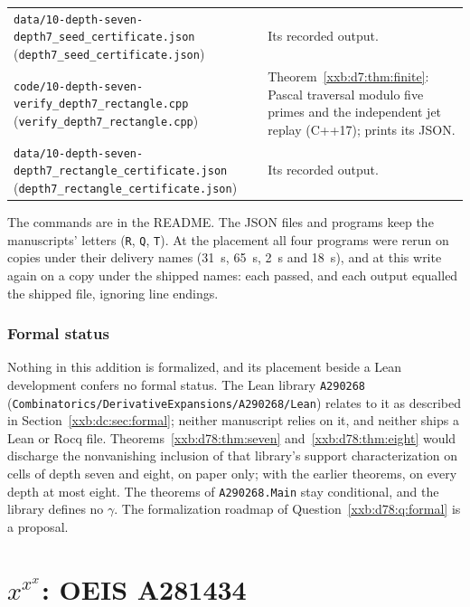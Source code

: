 \documentclass[11pt,a4paper]{article}
\numberwithin{equation}{section}
\theoremstyle{definition}
\theoremstyle{remark}
\theoremstyle{plain}
\begin{document}
\begin{longtable}{@{}>{\raggedright\arraybackslash}p{}>{\raggedright\arraybackslash}p{}@{}}
\texttt{data/10-depth-\allowbreak seven-\allowbreak depth7\_seed\_certificate.json} (\texttt{depth7\_\allowbreak seed\_\allowbreak certificate.json}) & Its recorded output.\\
\texttt{code/10-depth-\allowbreak seven-\allowbreak verify\_depth7\_rectangle.cpp} (\texttt{verify\_\allowbreak depth7\_\allowbreak rectangle.cpp}) & Theorem~\ref{xxb:d7:thm:finite}: Pascal traversal modulo five primes and the independent jet replay (C++17); prints its JSON.\\
\texttt{data/10-depth-\allowbreak seven-\allowbreak depth7\_rectangle\_certificate.json} (\texttt{depth7\_\allowbreak rectangle\_\allowbreak certificate.json}) & Its recorded output.\\
\bottomrule
\end{longtable}
\endgroup
\addtocounter{table}{-1}
The commands are in the README.  The JSON files and programs keep the
manuscripts' letters (\texttt{R}, \texttt{Q}, \texttt{T}).  At the placement
all four programs were rerun on copies under their delivery names (31~s, 65~s,
2~s and 18~s), and at this write again on a copy under the shipped names: each
passed, and each output equalled the shipped file, ignoring line endings.

\subsubsection{Formal status}\label{xxb:d78:sec:formal}

Nothing in this addition is formalized, and its placement beside a Lean
development confers no formal status.  The Lean library \texttt{A290268}
(\texttt{Combinatorics/\allowbreak DerivativeExpansions/\allowbreak A290268/\allowbreak Lean})
relates to it as described in Section~\ref{xxb:dc:sec:formal}; neither
manuscript relies on it, and neither ships a Lean or Rocq file.
Theorems~\ref{xxb:d78:thm:seven} and~\ref{xxb:d78:thm:eight} would discharge
the nonvanishing inclusion of that library's support characterization on cells
of depth seven and eight, on paper only; with the earlier theorems, on every
depth at most eight.  The theorems of \texttt{A290268.Main} stay conditional,
and the library defines no $\gamma$.  The formalization roadmap of
Question~\ref{xxb:d78:q:formal} is a proposal.

\clearpage
\section{\texorpdfstring{$x^{x^x}$}{x^(x^x)}: OEIS A281434}\label{xxc:part}
\end{document}
